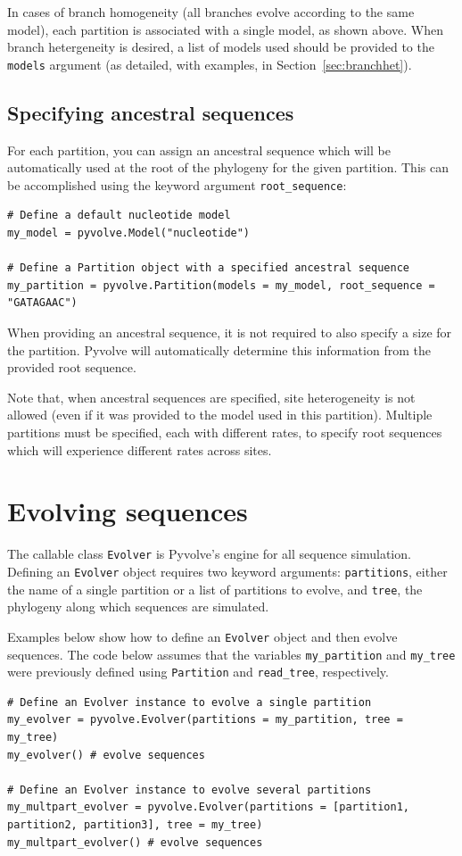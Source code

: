 \documentclass{article}
\newcommand{\code}[1]{\texttt{\small{#1}}}
\begin{document}
In cases of branch homogeneity (all branches evolve according to the same model), each partition is associated with a single model, as shown above. When branch hetergeneity is desired, a list of models used should be provided to the \code{models} argument (as detailed, with examples, in Section~\ref{sec:branchhet}).

\subsection{Specifying ancestral sequences}

For each partition, you can assign an ancestral sequence which will be automatically used at the root of the phylogeny for the given partition. This can be accomplished using the keyword argument \code{root\_sequence}:

\begin{lstlisting}
# Define a default nucleotide model
my_model = pyvolve.Model("nucleotide")

# Define a Partition object with a specified ancestral sequence
my_partition = pyvolve.Partition(models = my_model, root_sequence = "GATAGAAC")
\end{lstlisting}

When providing an ancestral sequence, it is not required to also specify a size for the partition. Pyvolve will automatically determine this information from the provided root sequence.

Note that, when ancestral sequences are specified, site heterogeneity is not allowed (even if it was provided to the model used in this partition). Multiple partitions must be specified, each with different rates, to specify root sequences which will experience different rates across sites.


\section{Evolving sequences}\label{sec:evolver}

The callable class \code{Evolver} is Pyvolve's engine for all sequence simulation. Defining an \code{Evolver} object requires two keyword arguments: \code{partitions}, either the name of a single partition or a list of partitions to evolve, and \code{tree}, the phylogeny along which sequences are simulated.

Examples below show how to define an \code{Evolver} object and then evolve sequences. The code below assumes that the variables \code{my\_partition} and \code{my\_tree} were previously defined using \code{Partition} and \code{read\_tree}, respectively.
\begin{lstlisting}
# Define an Evolver instance to evolve a single partition
my_evolver = pyvolve.Evolver(partitions = my_partition, tree = my_tree)
my_evolver() # evolve sequences

# Define an Evolver instance to evolve several partitions
my_multpart_evolver = pyvolve.Evolver(partitions = [partition1, partition2, partition3], tree = my_tree)
my_multpart_evolver() # evolve sequences
\end{lstlisting}
\end{document}

